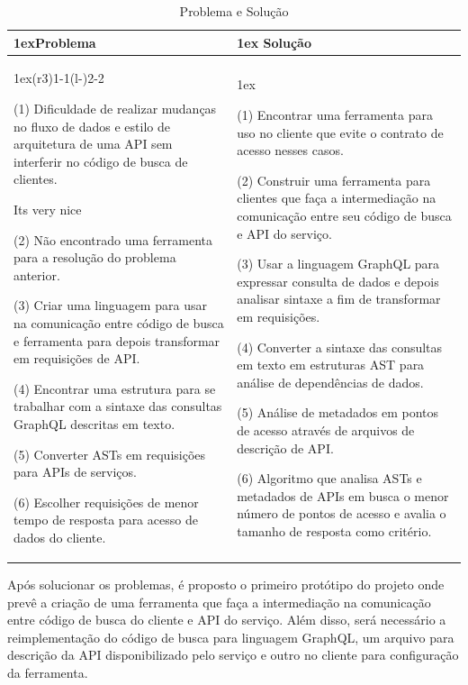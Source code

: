 \begin{table}
  \begin{tabularx}{\linewidth}{>{\parskip1ex}X@{\kern4\tabcolsep}>{\parskip1ex}X}
    \toprule
    \hfil\bfseries Problema
    &
    \hfil\bfseries Solução
    \\\cmidrule(r{3\tabcolsep}){1-1}\cmidrule(l{-\tabcolsep}){2-2}

    (1) Dificuldade de realizar mudanças no fluxo de dados e estilo de arquitetura de uma API sem interferir no código de busca de clientes.\par
Its very nice\par
    (2) Não encontrado uma ferramenta para a resolução do problema anterior.\par
    (3) Criar uma linguagem para usar na comunicação entre código de busca e ferramenta para depois transformar em requisições de API.\par
    (4) Encontrar uma estrutura para se trabalhar com a sintaxe das consultas GraphQL descritas em texto.\par
    (5) Converter ASTs em requisições para APIs de serviços.\par
    (6) Escolher requisições de menor tempo de resposta para acesso de dados do cliente.
    
    &

    (1) Encontrar uma ferramenta para uso no cliente que evite o contrato de acesso nesses casos.\par
    (2) Construir uma ferramenta para clientes que faça a intermediação na comunicação entre seu código de busca e API do serviço.\par
    (3) Usar a linguagem GraphQL para expressar consulta de dados e depois analisar sintaxe a fim de transformar em requisições.\par
    (4) Converter a sintaxe das consultas em texto em estruturas AST para análise de dependências de dados.\par
    (5) Análise de metadados em pontos de acesso através de arquivos de descrição de API.\par
    (6) Algoritmo que analisa ASTs e metadados de APIs em busca o menor número de pontos de acesso e avalia o tamanho de resposta como critério.

    \\\bottomrule
  \end{tabularx}
  \caption{Problema e Solução}
\end{table}

Após solucionar os problemas, é proposto o primeiro protótipo do projeto onde prevê a criação de uma ferramenta que faça a intermediação na comunicação entre código de busca do cliente e API do serviço. Além disso, será necessário a reimplementação do código de busca para linguagem GraphQL, um arquivo para descrição da API disponibilizado pelo serviço e outro no cliente para configuração da ferramenta.


